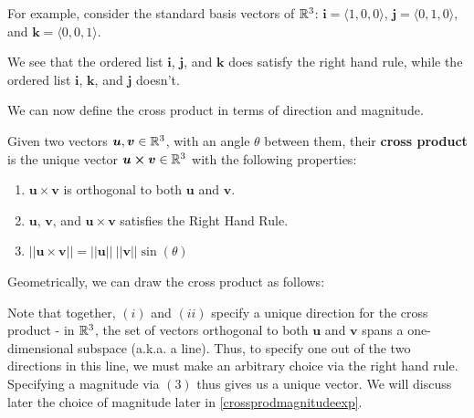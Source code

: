 \begin{example}
    For example, consider the standard basis vectors of $\mathbb{R}^3$:  $\bm{i} = \langle 1, 0 , 0 \rangle$, $\bm{j}= \langle 0,1 , 0 \rangle$, and $\bm{k}= \langle 0 , 0,1 \rangle$.

    We see that the ordered list $\bm{i}$, $\bm{j}$, and $\bm{k}$ does satisfy the right hand rule, while the ordered list $\bm{i}$, $\bm{k}$, and $\bm{j}$ doesn't.
\end{example}


We can now define the cross product in terms of direction and magnitude.

\begin{definition}\label{crossproddirmag}
    Given two vectors $\bm{u}, \bm{v} \in \mathbb{R}^3$, with an angle $\theta$ between them, their \textbf{cross product} is the \textnormal{unique} vector $\bm{u \times v} \in \mathbb{R}^3$ with the following properties:
    \begin{enumerate}[label=(\roman*)]
        \item $\bm{u \times v}$ is orthogonal to both $\bm{u}$ and $\bm{v}$.
        \item $\bm{u}$, $\bm{v}$, and $\bm{u \times v}$ satisfies the Right Hand Rule. 
        \item $||\bm{u \times v}|| = ||\bm{u}|| \ ||\bm{v}|| \sin(\theta)$
    \end{enumerate}
    
    Geometrically, we can draw the cross product as follows:
    
    \begin{center}
    \end{center}
    
    \end{definition}



Note that together, $(i)$ and $(ii)$ specify a unique direction for the cross product - in $\mathbb{R}^3$, the set of vectors orthogonal to both $\bm{u}$ and $\bm{v}$ spans a one-dimensional subspace (a.k.a. a line).  Thus, to specify one out of the two directions in this line, we must make an arbitrary choice via the right hand rule.  Specifying a magnitude via $(3)$ thus gives us a unique vector.  We will discuss later the choice of magnitude later in \ref{crossprodmagnitudeexp}.

